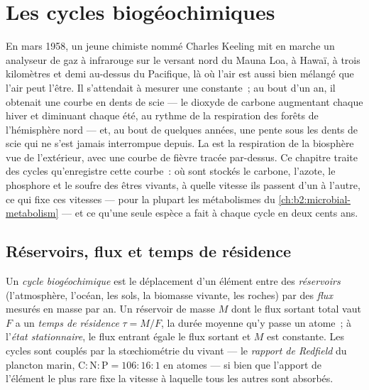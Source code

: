 \chapter{Les cycles biogéochimiques}\label{ch:b2:biogeochemical-cycles}

En mars 1958, un jeune chimiste nommé Charles Keeling mit en marche un
analyseur de gaz à infrarouge sur le versant nord du Mauna Loa, à Hawaï,
à trois kilomètres et demi au-dessus du Pacifique, là où l'air est aussi
bien mélangé que l'air peut l'être. Il s'attendait à mesurer une
constante~; au bout d'un an, il obtenait une courbe en dents de scie ---
le dioxyde de carbone augmentant chaque hiver et diminuant chaque été, au
rythme de la respiration des forêts de l'hémisphère nord --- et, au bout
de quelques années, une pente sous les dents de scie qui ne s'est jamais
interrompue depuis. La  est la respiration de la
biosphère vue de l'extérieur, avec une courbe de fièvre tracée par-dessus.
Ce chapitre traite des cycles qu'enregistre cette courbe~: où sont
stockés le carbone, l'azote, le phosphore et le soufre des êtres vivants,
à quelle vitesse ils passent d'un  à l'autre, ce qui fixe ces
vitesses --- pour la plupart les métabolismes du
\cref{ch:b2:microbial-metabolism} --- et ce qu'une seule espèce a fait à
chaque cycle en deux cents ans.

\section{Réservoirs, flux et temps de résidence}

\begin{definition}\label{def:b2:biogeochemical-cycles:reservoir}
Un \emph{cycle biogéochimique} est le déplacement d'un élément entre des
\emph{réservoirs} (l'atmosphère, l'océan, les sols, la biomasse vivante,
les roches) par des \emph{flux} mesurés en masse par an. Un réservoir de
masse $M$ dont le flux sortant total vaut $F$ a un \emph{temps de
résidence} $\tau = M/F$, la durée moyenne qu'y passe un atome~; à
l'\emph{état stationnaire}, le flux entrant égale le flux sortant et $M$
est constante. Les cycles sont couplés par la stœchiométrie du vivant ---
le \emph{rapport de Redfield} du plancton marin, $\mathrm{C:N:P} =
106:16:1$ en atomes --- si bien que l'apport de l'élément le plus rare
fixe la vitesse à laquelle tous les autres sont absorbés.
\end{definition}

